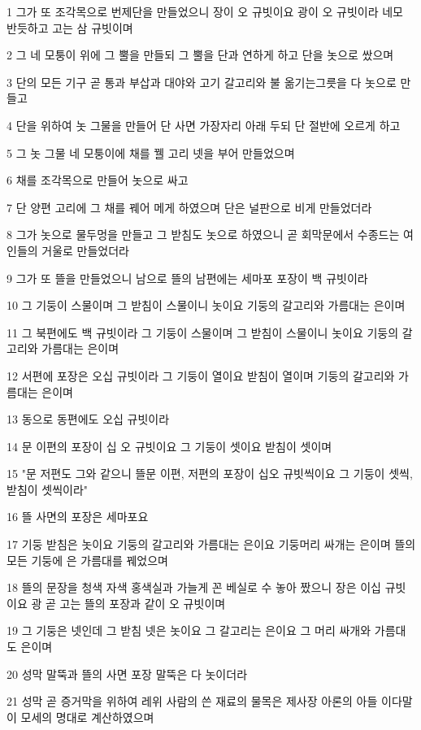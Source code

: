 \par 1 그가 또 조각목으로 번제단을 만들었으니 장이 오 규빗이요 광이 오 규빗이라 네모 반듯하고 고는 삼 규빗이며
\par 2 그 네 모퉁이 위에 그 뿔을 만들되 그 뿔을 단과 연하게 하고 단을 놋으로 쌌으며
\par 3 단의 모든 기구 곧 통과 부삽과 대야와 고기 갈고리와 불 옮기는그릇을 다 놋으로 만들고
\par 4 단을 위하여 놋 그물을 만들어 단 사면 가장자리 아래 두되 단 절반에 오르게 하고
\par 5 그 놋 그물 네 모퉁이에 채를 꿸 고리 넷을 부어 만들었으며
\par 6 채를 조각목으로 만들어 놋으로 싸고
\par 7 단 양편 고리에 그 채를 꿰어 메게 하였으며 단은 널판으로 비게 만들었더라
\par 8 그가 놋으로 물두멍을 만들고 그 받침도 놋으로 하였으니 곧 회막문에서 수종드는 여인들의 거울로 만들었더라
\par 9 그가 또 뜰을 만들었으니 남으로 뜰의 남편에는 세마포 포장이 백 규빗이라
\par 10 그 기둥이 스물이며 그 받침이 스물이니 놋이요 기둥의 갈고리와 가름대는 은이며
\par 11 그 북편에도 백 규빗이라 그 기둥이 스물이며 그 받침이 스물이니 놋이요 기둥의 갈고리와 가름대는 은이며
\par 12 서편에 포장은 오십 규빗이라 그 기둥이 열이요 받침이 열이며 기둥의 갈고리와 가름대는 은이며
\par 13 동으로 동편에도 오십 규빗이라
\par 14 문 이편의 포장이 십 오 규빗이요 그 기둥이 셋이요 받침이 셋이며
\par 15 "문 저편도 그와 같으니 뜰문 이편, 저편의 포장이 십오 규빗씩이요 그 기둥이 셋씩, 받침이 셋씩이라"
\par 16 뜰 사면의 포장은 세마포요
\par 17 기둥 받침은 놋이요 기둥의 갈고리와 가름대는 은이요 기둥머리 싸개는 은이며 뜰의 모든 기둥에 은 가름대를 꿰었으며
\par 18 뜰의 문장을 청색 자색 홍색실과 가늘게 꼰 베실로 수 놓아 짰으니 장은 이십 규빗이요 광 곧 고는 뜰의 포장과 같이 오 규빗이며
\par 19 그 기둥은 넷인데 그 받침 넷은 놋이요 그 갈고리는 은이요 그 머리 싸개와 가름대도 은이며
\par 20 성막 말뚝과 뜰의 사면 포장 말뚝은 다 놋이더라
\par 21 성막 곧 증거막을 위하여 레위 사람의 쓴 재료의 물목은 제사장 아론의 아들 이다말이 모세의 명대로 계산하였으며
